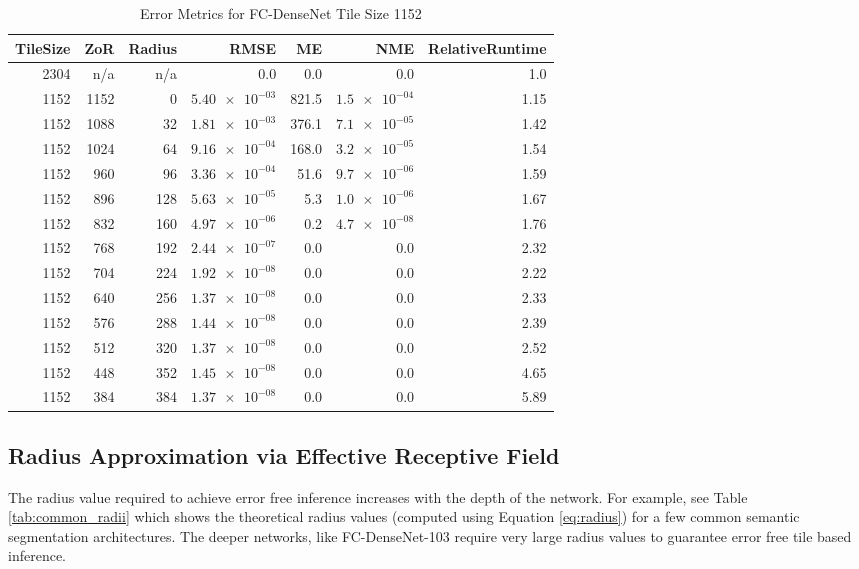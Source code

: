 \documentclass[runningheads]{llncs}
\begin{document}
\begin{table}[h!]
	\centering
	\caption{Error Metrics for FC-DenseNet Tile Size 1152}
	\label{tab:tile_size_1152}
	\begin{tabular}{r|r|r|r|r|r|r}
		TileSize & ZoR & Radius & RMSE    & ME & NME & RelativeRuntime \\ 
		\hline
2304 & n/a & n/a & 0.0 & 0.0 & 0.0 & 1.0 \\
1152 & 1152 & 0 & $\num{5.40e-03}$ & 821.5 & $\num{1.5e-04}$ & 1.15 \\
1152 & 1088 & 32 & $\num{1.81e-03}$ & 376.1 & $\num{7.1e-05}$ & 1.42 \\
1152 & 1024 & 64 & $\num{9.16e-04}$ & 168.0 & $\num{3.2e-05}$ & 1.54 \\
1152 & 960 & 96 & $\num{3.36e-04}$ & 51.6 & $\num{9.7e-06}$ & 1.59 \\
1152 & 896 & 128 & $\num{5.63e-05}$ & 5.3 & $\num{1.0e-06}$ & 1.67 \\
1152 & 832 & 160 & $\num{4.97e-06}$ & 0.2 & $\num{4.7e-08}$ & 1.76 \\
1152 & 768 & 192 & $\num{2.44e-07}$ & 0.0 & 0.0 & 2.32 \\
1152 & 704 & 224 & $\num{1.92e-08}$ & 0.0 & 0.0 & 2.22 \\
1152 & 640 & 256 & $\num{1.37e-08}$ & 0.0 & 0.0 & 2.33 \\
1152 & 576 & 288 & $\num{1.44e-08}$ & 0.0 & 0.0 & 2.39 \\
1152 & 512 & 320 & $\num{1.37e-08}$ & 0.0 & 0.0 & 2.52 \\
1152 & 448 & 352 & $\num{1.45e-08}$ & 0.0 & 0.0 & 4.65 \\
1152 & 384 & 384 & $\num{1.37e-08}$ & 0.0 & 0.0 & 5.89 \\
	\end{tabular}
\end{table}


\subsection{Radius Approximation via Effective Receptive Field}

The radius value required to achieve error free inference increases with the depth of the network. For example, see Table \ref{tab:common_radii} which shows the theoretical radius values (computed using Equation \ref{eq:radius}) for a few common semantic segmentation architectures. The deeper networks, like FC-DenseNet-103 require very large radius values to guarantee error free tile based inference.
\end{document}
